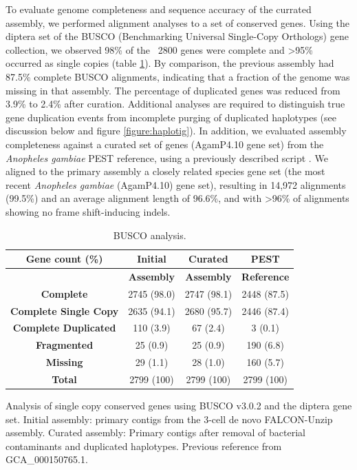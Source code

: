 \par{
To evaluate genome completeness and sequence accuracy of the currated assembly, we performed alignment analyses to a set of conserved genes. Using the diptera set of the BUSCO (Benchmarking Universal Single-Copy Orthologs) gene collection, we observed 98\% of the ~2800 genes were complete and >95\% occurred as single copies (table \ref{table:busco}). By comparison, the previous assembly had 87.5\% complete BUSCO alignments, indicating that a fraction of the genome was missing in that assembly. The percentage of duplicated genes was reduced from 3.9\% to 2.4\% after curation.  Additional analyses are required to distinguish true gene duplication events from incomplete purging of duplicated haplotypes (see discussion below and figure \ref{figure:haplotig}). In addition, we evaluated assembly completeness against a curated set of genes (AgamP4.10 gene set) from the \textit{Anopheles gambiae} PEST reference, using a previously described script \cite{avian}. We aligned to the primary assembly a closely related species gene set (the most recent \textit{Anopheles gambiae} (AgamP4.10) gene set), resulting in 14,972 alignments (99.5\%) and an average alignment length of 96.6\%, and with >96\% of alignments showing no frame shift-inducing indels.
}


\begin{table}[htbp!]
\caption{BUSCO analysis.}\label{table:busco}
\begin{tabular}{| c | c | c | c |}
\hline
 \textbf{Gene count (\%)} & \textbf{Initial} & \textbf{Curated} & \textbf{PEST} \\\hline
   & \textbf{Assembly} & \textbf{Assembly} & \textbf{Reference} \\\hline
 \textbf{Complete} & 2745 (98.0) & 2747 (98.1) & 2448 (87.5) \\\hline
  \textbf{Complete Single Copy} & 2635 (94.1) & 2680 (95.7) & 2446 (87.4)  \\\hline 
  \textbf{Complete Duplicated} & 110 (3.9) & 67 (2.4) & 3 (0.1) \\\hline 
  \textbf{Fragmented} & 25 (0.9) & 25 (0.9) & 190 (6.8) \\\hline 
  \textbf{Missing} & 29 (1.1) & 28 (1.0) & 160 (5.7) \\\hline 
   \textbf{Total} & 2799 (100) & 2799 (100) & 2799 (100) \\\hline
  
\end{tabular}
\par{ Analysis of single copy conserved genes using BUSCO v3.0.2 and the diptera gene set. Initial assembly: primary contigs from the 3-cell de novo FALCON-Unzip assembly. Curated assembly: Primary contigs after removal of bacterial contaminants and duplicated haplotypes. Previous reference from \cite{PEST}
GCA\_000150765.1.}
\end{table}



